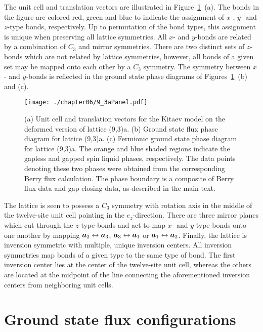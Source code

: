 The unit cell and translation vectors are illustrated in Figure~\ref{fig:chapter06_9_3aPanel}~(a).
The bonds in the figure are colored red, green and blue to indicate the assignment of $x$-, $y$- and $z$-type bonds, respectively.
Up to permutation of the bond types, this assignment is unique when preserving all lattice symmetries.
All $x$- and $y$-bonds are related by a combination of $C_3$ and mirror symmetries.
There are two distinct sets of $z$-bonds which are not related by lattice symmetries, however, all bonds of a given set may be mapped onto each other by a $C_3$ symmetry.
The symmetry between $x$- and $y$-bonds is reflected in the ground state phase diagrams of Figures~\ref{fig:chapter06_9_3aPanel}~(b) and (c).
%
\begin{figure}[tb]
	\centering
	\texttt{[image: ./chapter06/9\_3aPanel.pdf]}
	\caption{
		(a) Unit cell and translation vectors for the Kitaev model on the deformed version of lattice (9,3)a.
		(b) Ground state flux phase diagram for lattice (9,3)a.
		(c) Fermionic ground state phase diagram for lattice (9,3)a.
		The orange and blue shaded regions indicate the gapless and gapped spin liquid phases, respectively.
		The data points denoting these two phases were obtained from the corresponding Berry flux calculation.
		The phase boundary is a composite of Berry flux data and gap closing data, as described in the main text.
	}
	\label{fig:chapter06_9_3aPanel}
\end{figure}
%

The lattice is seen to possess a $C_3$ symmetry with rotation axis in the middle of the twelve-site unit cell pointing in the $\hat{e}_z$-direction.
There are three mirror planes which cut through the $z$-type bonds and act to map $x$- and $y$-type bonds onto one another by mapping $\bm{a}_2 \leftrightarrow \bm{a}_3$, $\bm{a}_3 \leftrightarrow \bm{a}_1$ or $\bm{a}_1 \leftrightarrow \bm{a}_2$.
Finally, the lattice is inversion symmetric with multiple, unique inversion centers.
All inversion symmetries map bonds of a given type to the same type of bond.
The first inversion center lies at the center of the twelve-site unit cell, whereas the others are located at the midpoint of the line connecting the aforementioned inversion centers from neighboring unit cells.


%
%
\section{Ground state flux configurations}
\label{section:chapter06_Fluxes}
%
%
